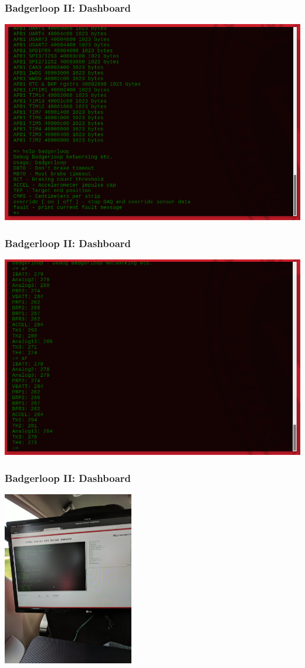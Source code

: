 \documentclass{beamer}
\begin{document}
\begin{frame}
\frametitle{Badgerloop II: Dashboard}
\begin{center}
\includegraphics[width=\linewidth]{assets/badgerloop_2/Dashboard/dash_cli_example}
\end{center}
\end{frame}

\begin{frame}
\frametitle{Badgerloop II: Dashboard}
\begin{center}
\includegraphics[width=\linewidth]{assets/badgerloop_2/Dashboard/dash_live_ar}
\end{center}
\end{frame}

\begin{frame}
\frametitle{Badgerloop II: Dashboard}
\begin{center}
\includegraphics[height=3in]{assets/badgerloop_2/Dashboard/in_the_car}
\end{center}
\end{frame}
\end{document}
